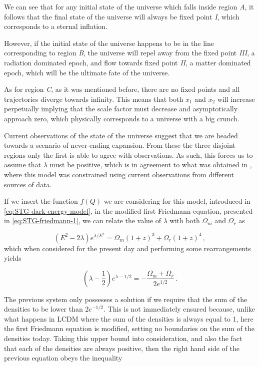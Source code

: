 We can see that for any initial state of the universe which falls inside region \textit{A}, it follows that the final state of the universe will always be fixed point \textit{I}, which corresponds to a eternal inflation.

However, if the initial state of the universe happens to be in the line corresponding to region \textit{B}, the universe will repel away from the fixed point \textit{III}, a radiation dominated epoch, and flow towards fixed point \textit{II}, a matter dominated epoch, which will be the ultimate fate of the universe.

As for region \textit{C}, as it was mentioned before, there are no fixed points and all trajectories diverge towards infinity. This means that both $x_1$ and $x_2$ will increase perpetually implying that the scale factor must decrease and asymptotically approach zero, which physically corresponds to a universe with a big crunch.

Current observations of the state of the universe suggest that we are headed towards a scenario of never-ending expansion. From these the three disjoint regions only the first is able to agree with observations. As such, this forces us to assume that $\lambda$ must be positive, which is in agreement to what was obtained in \cite{Anagnostopoulos2021}, where this model was constrained using current observations from different sources of data.

If we insert the function $f(Q)$ we are considering for this model, introduced in \cref{eq:STG-dark-energy-model}, in the modified first Friedmann equation, presented in \cref{eq:STG-friedmann-1}, we can relate the value of $\lambda$ with both $\Omega_m$ and $\Omega_r$ as

\begin{equation}
    \label{eq:STG-dark-energy-friedmann-1}
    (E^2 - 2\lambda)e^{\lambda/E^2} = \Omega_m (1+z)^3 + \Omega_r (1+z)^4 \,,
\end{equation}
which when considered for the present day and performing some rearrangements yields

\begin{equation}
    \label{eq:STG-dark-energy-omegas-conservation}
    \left( \lambda - \frac{1}{2} \right) e^{\lambda - 1/2} = - \frac{\Omega_m + \Omega_r}{2e^{1/2}} \,.
\end{equation}

The previous system only possesses a solution if we require that the sum of the densities to be lower than $2 e^{-1/2}$. This is not immediately ensured because, unlike what happens in \gls{LCDM} where the sum of the densities is always equal to 1, here the first Friedmann equation is modified, setting no boundaries on the sum of the densities today. Taking this upper bound into consideration, and also the fact that each of the densities are always positive, then the right hand side of the previous equation obeys the inequality

